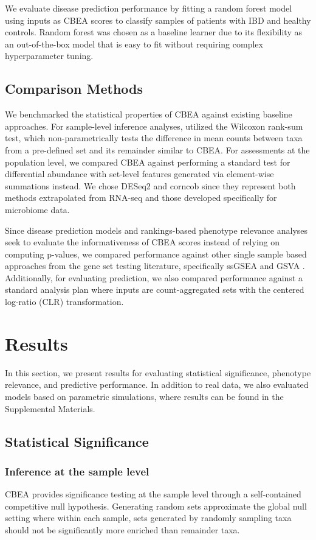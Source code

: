 \documentclass[10pt,letterpaper]{article}
\begin{document}
We evaluate disease prediction performance by fitting a random forest model \cite{breiman2001} using inputs as CBEA scores to classify samples of patients with IBD and healthy controls. Random forest was chosen as a baseline learner due to its flexibility as an out-of-the-box model that is easy to fit without requiring complex hyperparameter tuning. 

\subsection*{Comparison Methods} 
We benchmarked the statistical properties of CBEA against existing baseline approaches. For sample-level inference analyses, utilized the Wilcoxon rank-sum test, which non-parametrically tests the difference in mean counts between taxa from a pre-defined set and its remainder similar to CBEA. For assessments at the population level, we compared CBEA against performing a standard test for differential abundance with set-level features generated via element-wise summations instead. We chose DESeq2 \cite{love2014} and corncob \cite{martin2020} since they represent both methods extrapolated from RNA-seq \cite{mcmurdie2014} and those developed specifically for microbiome data.   

Since disease prediction models and rankings-based phenotype relevance analyses seek to evaluate the informativeness of CBEA scores instead of relying on computing p-values, we compared performance against other single sample based approaches from the gene set testing literature, specifically ssGSEA \cite{barbie2009} and GSVA \cite{hanzelmann2013}. Additionally, for evaluating prediction, we also compared performance against a standard analysis plan where inputs are count-aggregated sets with the centered log-ratio (CLR) transformation. 

\section*{Results}
In this section, we present results for evaluating statistical significance, phenotype relevance, and predictive performance. In addition to real data, we also evaluated models based on parametric simulations, where results can be found in the Supplemental Materials.   

\subsection*{Statistical Significance}
\subsubsection*{Inference at the sample level}
CBEA provides significance testing at the sample level through a self-contained competitive null hypothesis. Generating random sets approximate the global null setting where within each sample, sets generated by randomly sampling taxa should not be significantly more enriched than remainder taxa.   
\end{document}
